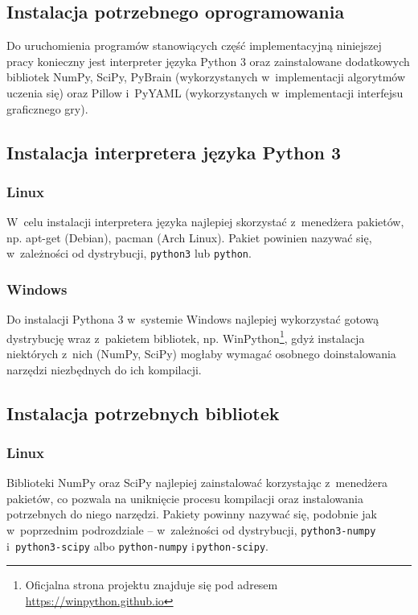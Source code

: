 \documentclass[a4paper, 12pt, oneside]{report}
\begin{document}
\begin{appendix}
\appendix
\chapter{Instalacja potrzebnego oprogramowania}

Do uruchomienia programów stanowiących część implementacyjną niniejszej pracy konieczny jest interpreter języka Python 3 oraz zainstalowane dodatkowych bibliotek NumPy, SciPy, PyBrain (wykorzystanych w~implementacji algorytmów uczenia się) oraz Pillow i~PyYAML (wykorzystanych w~implementacji interfejsu graficznego gry).

\section{Instalacja interpretera języka Python 3}
\subsection{Linux}
 W~celu instalacji interpretera języka najlepiej skorzystać z~menedżera pakietów, np. apt-get (Debian), pacman (Arch Linux). Pakiet powinien nazywać się, w~zależności od dystrybucji, \texttt{python3} lub \texttt{python}.

\subsection{Windows}
Do instalacji Pythona 3 w~systemie Windows najlepiej wykorzystać gotową dystrybucję wraz z~pakietem bibliotek, np. WinPython\footnote{Oficjalna strona projektu znajduje się pod adresem \url{https://winpython.github.io}}, gdyż instalacja niektórych z~nich (NumPy, SciPy) mogłaby wymagać osobnego doinstalowania narzędzi niezbędnych do ich kompilacji.

\section{Instalacja potrzebnych bibliotek}
\subsection{Linux}
Biblioteki NumPy oraz SciPy najlepiej zainstalować korzystając z~menedżera pakietów, co pozwala na uniknięcie procesu kompilacji oraz instalowania potrzebnych do niego narzędzi. Pakiety powinny nazywać się, podobnie jak w~poprzednim podrozdziale -- w~zależności od dystrybucji, \texttt{\mbox{python3-numpy}} i~\texttt{\mbox{python3-scipy}} albo \texttt{\mbox{python-numpy}} i\,\texttt{\mbox{python-scipy}}.


\end{appendix}
\end{document}
